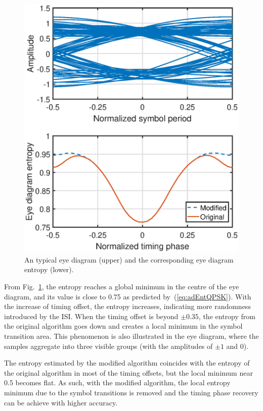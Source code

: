 \documentclass[journal,comsoc]{IEEEtran}
\begin{document}
\begin{figure}[htbp]
\centering
\includegraphics[width=3 in]{pic/timing.eps}
\caption{An typical eye diagram (upper) and the corresponding eye diagram entropy (lower).}
\label{fig:timing} 
\end{figure}

From Fig.~\ref{fig:timing}, the entropy reaches a global minimum in the centre of the eye diagram, and its value is close to 0.75 as predicted by~(\ref{eq:adEntQPSK}).
With the increase of timing offset, the entropy increases, indicating  more randomness introduced by the ISI.
When the timing offset is beyond $\pm 0.35$, the  entropy from the original algorithm goes down and creates a local minimum in the symbol transition area. 
This phenomenon is also illustrated in the eye diagram, where the samples aggregate into three visible groups (with the amplitudes of \(\pm 1\) and 0).

The entropy estimated by the modified algorithm coincides with the entropy of the original algorithm in most of the timing offsets, but the local minimum near 0.5 becomes flat.
As such, with the modified algorithm, the local entropy minimum due to the symbol transitions is removed and the timing phase recovery can be achieve with higher accuracy.
\end{document}
